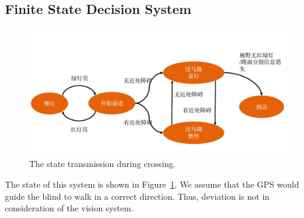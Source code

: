 


\subsection{Finite State Decision System}

\begin{figure}[t]
\begin{center}
 \includegraphics[width=1.\linewidth]{figure/fsm_state.jpeg}
\end{center}
   \caption{The state transmission during crossing.}
\label{fig:fsm}
\end{figure}
The state of this system is shown in Figure~\ref{fig:fsm}. We assume that the GPS would guide the blind to walk in a correct direction. Thus, deviation is not in consideration of the vision system. 
